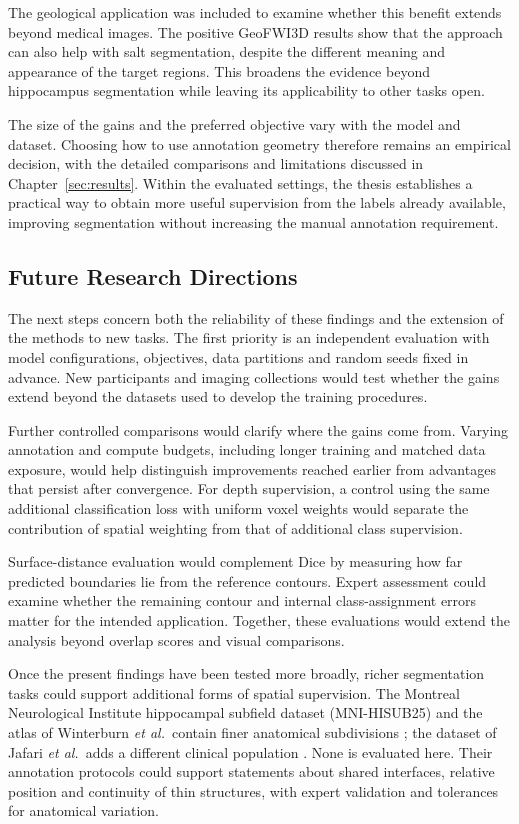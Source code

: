 \documentclass[12pt,a4paper]{article}
\begin{document}
The geological application was included to examine whether this benefit
extends beyond medical images. The positive GeoFWI3D results show that
the approach can also help with salt segmentation, despite the different
meaning and appearance of the target regions. This broadens the evidence
beyond hippocampus segmentation while leaving its applicability to other
tasks open.

The size of the gains and the preferred objective vary with the model and
dataset. Choosing how to use annotation geometry therefore remains an
empirical decision, with the detailed comparisons and limitations discussed
in Chapter~\ref{sec:results}. Within the evaluated settings, the thesis
establishes a practical way to obtain more useful supervision from the
labels already available, improving segmentation without increasing the
manual annotation requirement.

\subsection{Future Research Directions}\label{sec:future-work}
\label{sec:pending-results}

The next steps concern both the reliability of these findings and the
extension of the methods to new tasks. The first priority is an
independent evaluation with model configurations, objectives, data
partitions and random seeds fixed in advance. New participants and imaging collections would test
whether the gains extend beyond the datasets used to develop the
training procedures.

Further controlled comparisons would clarify where the gains come from.
Varying annotation and compute budgets, including longer training and
matched data exposure, would help distinguish improvements reached
earlier from advantages that persist after convergence. For depth
supervision, a control using the same additional classification loss
with uniform voxel weights would separate the contribution of spatial
weighting from that of additional class supervision.

Surface-distance evaluation would complement Dice by measuring how far
predicted boundaries lie from the reference contours. Expert assessment
could examine whether the remaining contour and internal class-assignment
errors matter for the intended application. Together, these evaluations
would extend the analysis beyond overlap scores and visual comparisons.

Once the present findings have been tested more broadly, richer
segmentation tasks could support additional forms of spatial supervision.
The Montreal Neurological Institute hippocampal subfield dataset
(MNI-HISUB25) and the atlas of Winterburn \emph{et al.}\ contain finer
anatomical subdivisions
\cite{kulaga2015subfields,winterburn2013atlas}; the dataset of
Jafari \emph{et al.}\ adds a different clinical population
\cite{jafari2011dataset}. None is evaluated here. Their annotation
protocols could support statements about shared interfaces, relative
position and continuity of thin structures, with expert validation and
tolerances for anatomical variation.
\end{document}

